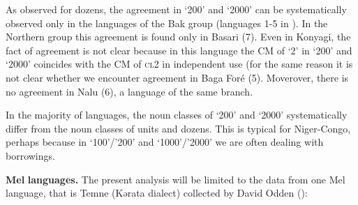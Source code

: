 \begin{table}
\caption{\label{tab:1:14} Agreement in `200' and `2000'}

\end{table}


As observed for dozens, the agreement in ‘200’ and ‘2000’ can be systematically observed only in the languages of the Bak group (languages 1-5 in ). In the Northern group this agreement is found only in Basari (7). Even in Konyagi, the fact of agreement is not clear because in this language the CM of ‘2’ in ‘200’ and ‘2000’ coincides with the CM of \textsc{cl}2 in independent use (for the same reason it is not clear whether we encounter agreement in Baga Foré (5). Moverover, there is no agreement in Nalu (6), a language of the same branch. 

In the majority of languages, the noun classes of ‘200’ and ‘2000’ systematically differ from the noun classes of units and dozens. This is typical for Niger-Congo, perhaps because in ‘100’/’200’ and ‘1000’/’2000’ we are often dealing with borrowings.

\textbf{Mel} \textbf{languages.} The present analysis will be limited to the data from one Mel language, that is Temne (Kərata dialect) collected by David Odden ():


